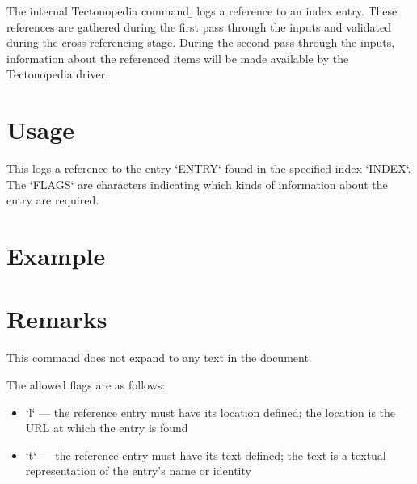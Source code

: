 
The internal Tectonopedia command \b{\string\pediaLogRef} logs a reference to an
index entry. These references are gathered during the first pass through the
inputs and validated during the cross-referencing stage. During the second pass
through the inputs, information about the referenced items will be made
available by the Tectonopedia driver.

\section*{Usage}

\begin{texdisp}
\end{texdisp}

This logs a reference to the entry \tex`ENTRY` found in the specified index
\tex`INDEX`. The \tex`FLAGS` are characters indicating which kinds of
information about the entry are required.

\section*{Example}

\begin{texdisp}
\end{texdisp}

\section*{Remarks}

This command does not expand to any text in the document.

The allowed flags are as follows:

\begin{itemize}
\item \tex`l` — the reference entry must have its location defined; the
    location is the URL at which the entry is found
\item \tex`t` — the reference entry must have its text defined; the text
    is a textual representation of the entry's name or identity
\end{itemize}


\tduxEmit %




